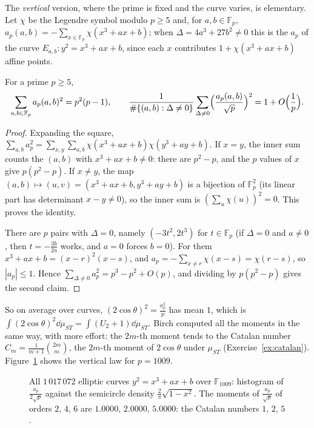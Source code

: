 The \emph{vertical} version, where the prime is fixed and the curve varies, is elementary. Let $\chi$ be the Legendre symbol modulo $p\ge5$ and, for $a,b\in\mathbb F_p$, $a_p(a,b)=-\sum_{x\in\mathbb F_p}\chi(x^3+ax+b)$; when $\Delta=4a^3+27b^2\ne0$ this is the $a_p$ of the curve $E_{a,b}:y^2=x^3+ax+b$, since each $x$ contributes $1+\chi(x^3+ax+b)$ affine points.

\begin{proposition}[Birch, 1968]\label{prop:birch}
For a prime $p\ge5$,
\[
\sum_{a,b\in\mathbb F_p}a_p(a,b)^2=p^2(p-1),\qquad\frac1{\#\{(a,b):\Delta\ne0\}}\sum_{\Delta\ne0}\Bigl(\frac{a_p(a,b)}{\sqrt p}\Bigr)^2=1+O\Bigl(\frac1p\Bigr).
\]
\end{proposition}
\begin{proof}
Expanding the square, $\sum_{a,b}a_p^2=\sum_{x,y}\sum_{a,b}\chi(x^3+ax+b)\chi(y^3+ay+b)$. If $x=y$, the inner sum counts the $(a,b)$ with $x^3+ax+b\ne0$: there are $p^2-p$, and the $p$ values of $x$ give $p(p^2-p)$. If $x\ne y$, the map $(a,b)\mapsto(u,v)=(x^3+ax+b,y^3+ay+b)$ is a bijection of $\mathbb F_p^2$ (its linear part has determinant $x-y\ne0$), so the inner sum is $(\sum_u\chi(u))^2=0$. This proves the identity.

There are $p$ pairs with $\Delta=0$, namely $(-3t^2,2t^3)$ for $t\in\mathbb F_p$ (if $\Delta=0$ and $a\ne0$, then $t=-\frac{3b}{2a}$ works, and $a=0$ forces $b=0$). For them $x^3+ax+b=(x-r)^2(x-s)$, and $a_p=-\sum_{x\ne r}\chi(x-s)=\chi(r-s)$, so $|a_p|\le1$. Hence $\sum_{\Delta\ne0}a_p^2=p^3-p^2+O(p)$, and dividing by $p(p^2-p)$ gives the second claim.
\end{proof}

So on average over curves, $(2\cos\theta)^2=\frac{a_p^2}p$ has mean $1$, which is $\int(2\cos\theta)^2\dd\mu_{ST}=\int(U_2+1)\dd\mu_{ST}$. Birch computed all the moments in the same way, with more effort: the $2m$-th moment tends to the Catalan number $C_m=\frac1{m+1}\binom{2m}m$, the $2m$-th moment of $2\cos\theta$ under $\mu_{ST}$ (Exercise~\ref{ex:catalan}). Figure~\ref{fig:birch} shows the vertical law for $p=1009$.

\begin{figure}[ht]
\centering{}
\caption{All $1\,017\,072$ elliptic curves $y^2=x^3+ax+b$ over $\mathbb F_{1009}$: histogram of $\frac{a_p}{2\sqrt p}$ against the semicircle density $\frac2\pi\sqrt{1-x^2}$. The moments of $\frac{a_p}{\sqrt p}$ of orders $2$, $4$, $6$ are $1.0000$, $2.0000$, $5.0000$: the Catalan numbers $1$, $2$, $5$.}
\label{fig:birch}
\end{figure}

